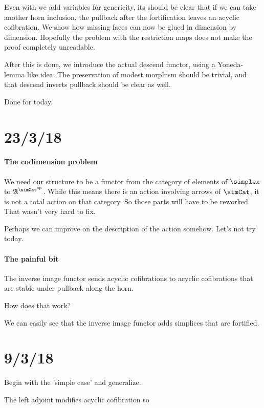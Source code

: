 \documentclass[csh.tex]{subfiles}
\begin{document}
Even with we add variables for genericity, its should be clear that if we can take another horn inclusion, the pullback after the fortification leaves an acyclic cofibration. We show how missing faces can now be glued in dimension by dimension. Hopefully the problem with the restriction maps does not make the proof completely unreadable.

After this is done, we introduce the actual descend functor, using a Yoneda-lemma like idea. The preservation of modest morphism should be trivial, and that descend inverts pullback should be clear as well.

Done for today.

\section{23/3/18}
\paragraph{The codimension problem}
We need our structure to be a functor from the category of elements of $\simplex$ to $\ambient\s$. While this means there is an action involving arrows of $\simCat$, it is not a total action on that category. So those parts will have to be reworked. That wasn't very hard to fix.

Perhaps we can improve on the description of the action somehow. Let's not try today.

\paragraph{The painful bit}
The inverse image functor sends acyclic cofibrations to acyclic cofibrations that are stable under pullback along the horn.

How does that work?

We can easily see that the inverse image functor adds simplices that are fortified.

\section{9/3/18}

Begin with the 'simple case' and generalize.

The left adjoint modifies acyclic cofibration so 
\end{document}
